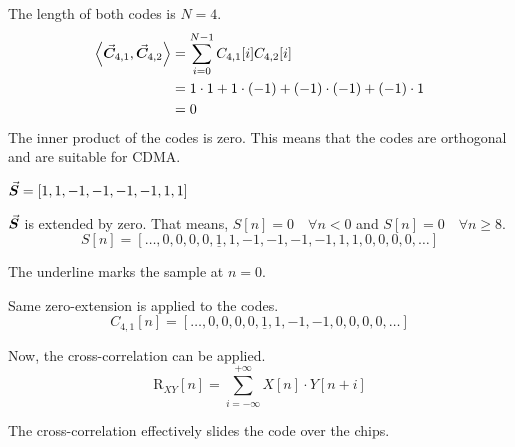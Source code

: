 \begin{solution}
	\begin{tasks}
		\task
		The length of both codes is $N = 4$.
		\begin{equation*}
			\begin{split}
				\left\langle \vec{\bm{C}}_{4,1}, \vec{\bm{C}}_{4,2} \right\rangle &= \sum\limits_{i = 0}^{N - 1} C_{4,1}[i] C_{4,2}[i] \\
				 &= 1 \cdot 1 + 1 \cdot (-1) + (-1) \cdot (-1) + (-1) \cdot 1 \\
				 &= 0
			\end{split}
		\end{equation*}
		The inner product of the codes is zero. This means that the codes are orthogonal and are suitable for CDMA.
		
		\task
		$\vec{\bm{S}} = \left[1,1,-1,-1,-1,-1,1,1\right]$
		
		\task
		{
			\tiny
			$\vec{\bm{S}}$ is extended by zero. That means, $S[n] = 0 \quad \forall n < 0$ and $S[n] = 0 \quad \forall n \geq 8$.
			\begin{equation*}
				S[n] = \left[\ldots,0,0,0,0,\underline{1},1,-1,-1,-1,-1,1,1,0,0,0,0,\ldots\right]
			\end{equation*}
			\begin{remark}
				The underline marks the sample at $n = 0$.
			\end{remark}
		
			Same zero-extension is applied to the codes.
			\begin{equation*}
				C_{4,1}[n] = \left[\ldots,0,0,0,0,\underline{1},1,-1,-1,0,0,0,0,\ldots\right]
			\end{equation*}
		
			Now, the cross-correlation can be applied.
			\begin{equation*}
				\mathrm{R}_{XY}[n] = \sum\limits_{i = -\infty}^{+\infty} X[n] \cdot Y[n+i]
			\end{equation*}
			
			The cross-correlation effectively slides the code over the chips.
		
}
\end{tasks}
\end{solution}
